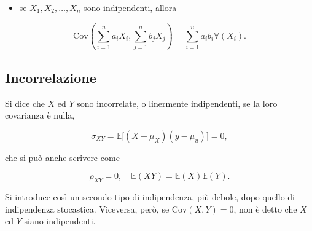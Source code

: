 \documentclass[
  11pt,
]{krantz}
\providecommand{\tightlist}{%
  \setlength{\itemsep}{0pt}\setlength{\parskip}{0pt}}
\theoremstyle{definition}
\theoremstyle{definition}
\theoremstyle{definition}
\theoremstyle{definition}
\theoremstyle{remark}
\begin{document}
\begin{itemize}
\tightlist
\item
  se \(X_1, X_2, \dots, X_n\) sono indipendenti, allora
\end{itemize}

\begin{equation}
\mbox{Cov}\left(\sum_{i=1}^n a_i X_i, \sum_{j=1}^n b_jX_j\right) = \sum_{i=1}^n a_i b_i \mathbb{V}(X_i).
\end{equation}

\hypertarget{incorrelazione}{%
\subsection{Incorrelazione}\label{incorrelazione}}

Si dice che \(X\) ed \(Y\) sono incorrelate, o linermente indipendenti, se la loro covarianza è nulla,

\begin{equation}
\sigma_{XY} = \mathbb{E} \big[(X - \mu_X) (y-\mu_u) \big] = 0,
\end{equation}

che si può anche scrivere come

\begin{equation}
\rho_{XY} = 0, \quad \mathbb{E}(XY) = \mathbb{E}(X) \mathbb{E}(Y).
\end{equation}

Si introduce così un secondo tipo di indipendenza, più debole, dopo quello di indipendenza stocastica. Viceversa, però, se \(\mbox{Cov}(X, Y) = 0\), non è detto che \(X\) ed \(Y\) siano indipendenti.
\end{document}
